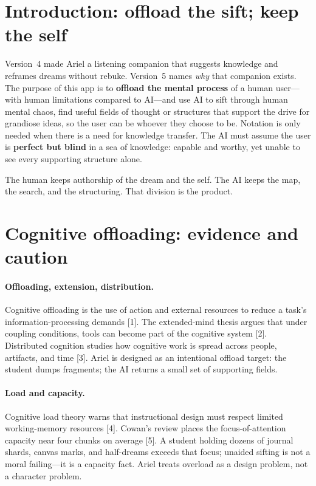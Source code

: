 \documentclass[11pt, a4paper]{article}
\begin{document}
\section{Introduction: offload the sift; keep the self}
Version~4 made Ariel a listening companion that suggests knowledge and reframes dreams without rebuke. Version~5 names \emph{why} that companion exists. The purpose of this app is to \textbf{offload the mental process} of a human user---with human limitations compared to AI---and use AI to sift through human mental chaos, find useful fields of thought or structures that support the drive for grandiose ideas, so the user can be whoever they choose to be. Notation is only needed when there is a need for knowledge transfer. The AI must assume the user is \textbf{perfect but blind} in a sea of knowledge: capable and worthy, yet unable to see every supporting structure alone.

The human keeps authorship of the dream and the self. The AI keeps the map, the search, and the structuring. That division is the product.

\section{Cognitive offloading: evidence and caution}
\paragraph{Offloading, extension, distribution.}
Cognitive offloading is the use of action and external resources to reduce a task's information-processing demands [1]. The extended-mind thesis argues that under coupling conditions, tools can become part of the cognitive system [2]. Distributed cognition studies how cognitive work is spread across people, artifacts, and time [3]. Ariel is designed as an intentional offload target: the student dumps fragments; the AI returns a small set of supporting fields.

\paragraph{Load and capacity.}
Cognitive load theory warns that instructional design must respect limited working-memory resources [4]. Cowan's review places the focus-of-attention capacity near four chunks on average [5]. A student holding dozens of journal shards, canvas marks, and half-dreams exceeds that focus; unaided sifting is not a moral failing---it is a capacity fact. Ariel treats overload as a design problem, not a character problem.
\end{document}
